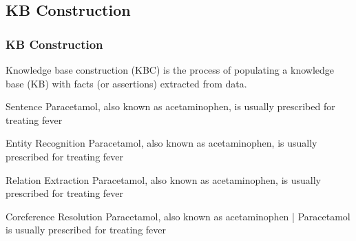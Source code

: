 \documentclass[t]{beamer}
\begin{document}
\subsection{KB Construction}
\begin{frame}
    \frametitle{KB Construction}
    \begin{itemize}
    \small{\item Knowledge base construction (KBC) is the process of populating a knowledge base (KB) with facts (or assertions) extracted from data.}
    \end{itemize}
    \begin{block}{Sentence}
        \scriptsize{Paracetamol, also known as acetaminophen, is usually prescribed for treating fever}
    \end{block}
    \begin{block}{Entity Recognition}
        \scriptsize{{\color{red} Paracetamol}, also known as {\color{red} acetaminophen}, is usually prescribed for treating {\color{red} fever}}
    \end{block}
    \begin{block}{Relation Extraction}
        \scriptsize{{\color{red} Paracetamol}, also {\color{teal} known as} {\color{red} acetaminophen}, is usually {\color{teal} prescribed for} treating {\color{red} fever}}
    \end{block}
    \begin{block}{Coreference Resolution}
        \scriptsize{{\color{red} Paracetamol}, also {\color{teal} known as} {\color{red} acetaminophen} | {\color{red} Paracetamol} is usually {\color{teal} prescribed for} treating {\color{red} fever}}
    \end{block}
\end{frame}
\end{document}
